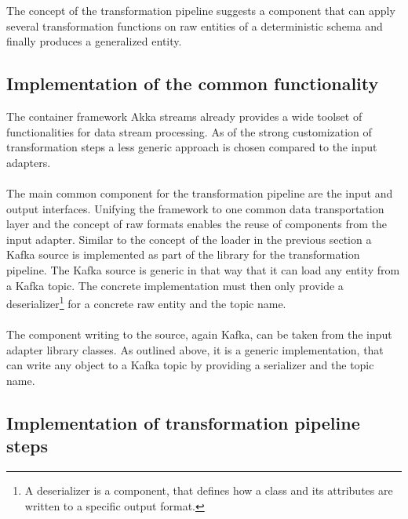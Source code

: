 The concept of the transformation pipeline suggests a component that can apply several transformation functions on raw entities of a deterministic schema and finally produces a generalized entity.

\subsection{Implementation of the common functionality}

The container framework Akka streams already provides a wide toolset of functionalities for data stream processing. As of the strong customization of transformation steps a less generic approach is chosen compared to the input adapters. 
\\\\
The main common component for the transformation pipeline are the input and output interfaces. Unifying the framework to one common data transportation layer and the concept of raw formats enables the reuse of components from the input adapter. Similar to the concept of the loader in the previous section a Kafka source is implemented as part of the library for the transformation pipeline. The Kafka source is generic in that way that it can load any entity from a Kafka topic. The concrete implementation must then only provide a deserializer\footnote{A deserializer is a component, that defines how a class and its attributes are written to a specific output format.} for a concrete raw entity and the topic name.
\\\\
The component writing to the source, again Kafka, can be taken from the input adapter library classes. As outlined above, it is a generic implementation, that can write any object to a Kafka topic by providing a serializer and the topic name.

\subsection{Implementation of transformation pipeline steps}

